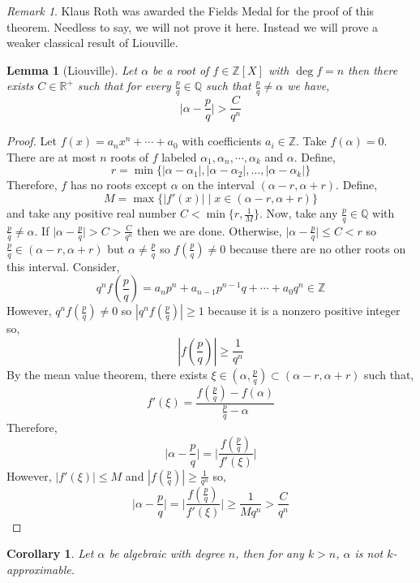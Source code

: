 \documentclass{article}
\newcommand{\Z}{\mathbb{Z}}
\newcommand{\Q}{\mathbb{Q}}
\newcommand{\Rplus}{\mathbb{R}^+}
\theoremstyle{theorem}
\newtheorem{lemma}[theorem]{Lemma}
\newtheorem{corollary}[theorem]{Corollary}
\theoremstyle{definition}
\theoremstyle{definition}
\theoremstyle{remark}
\theoremstyle{definition}
\theoremstyle{remark}
\newtheorem{remark}{Remark}[subsection]
\begin{document}
\begin{remark}
Klaus Roth was awarded the Fields Medal for the proof of this theorem. Needless to say, we will not prove it here. Instead we will prove a weaker classical result of Liouville.
\end{remark}

\begin{lemma}[Liouville]
Let $\alpha$ be a root of $f \in \Z[X]$ with $\deg{f} = n$ then there exists $C \in \Rplus$ such that for every $\frac{p}{q} \in \Q$ such that $\frac{p}{q} \neq \alpha$ we have,
\[ \Big| \alpha - \frac{p}{q} \Big| > \frac{C}{q^n}\]
\end{lemma}

\begin{proof}
Let $f(x) = a_n x^n + \cdots + a_0$ with coefficients $a_i \in \Z$. Take $f(\alpha) = 0$. There are at most $n$ roots of $f$ labeled $\alpha_1, \alpha_n, \cdots, \alpha_k$ and $\alpha$. Define, 
\[r = \min\{|\alpha - \alpha_1|, |\alpha - \alpha_2|, \dots, |\alpha - \alpha_k|\}\]
Therefore, $f$ has no roots except $\alpha$ on the interval $(\alpha - r, \alpha + r)$. Define, 
\[ M = \max \{ |f'(x)| \mid x \in (\alpha - r, \alpha + r) \}\]
and take any positive real number $C < \min\{r, \frac{1}{M}\}$. 
Now, take any $\frac{p}{q} \in \Q$ with $\frac{p}{q} \neq \alpha$. If $\Big| \alpha - \frac{p}{q} \Big| > C > \frac{C}{q^n}$ then we are done. Otherwise, $\Big| \alpha - \frac{p}{q} \Big| \le C < r$ so $\frac{p}{q} \in (\alpha - r, \alpha + r)$ but $\alpha \neq \frac{p}{q}$ so $f(\frac{p}{q}) \neq 0$ because there are no other roots on this interval. Consider,
\[q^n f\left(\frac{p}{q}\right) = a_n p^n + a_{n-1} p^{n-1}q + \cdots + a_0 q^n \in \Z\]
However, $q^n f(\frac{p}{q}) \neq 0$ so $|q^n f(\frac{p}{q})| \ge 1$ because it is a nonzero positive integer so,
\[ \left| f \left( \frac{p}{q} \right) \right| \ge \frac{1}{q^n} \]
By the mean value theorem, there exists $\xi \in (\alpha, \frac{p}{q}) \subset (\alpha - r, \alpha + r)$
such that, \[f'(\xi) = \frac{f(\frac{p}{q}) - f(\alpha)}{\frac{p}{q} - \alpha}\]
Therefore, 
\[\Big| \alpha - \frac{p}{q} \Big| = \Bigg| \frac{f(\frac{p}{q})}{f'(\xi)} \Bigg| \] 
However, $|f'(\xi)| \le M$ and $|f(\frac{p}{q})| \ge \frac{1}{q^n}$ so,
\[\Big| \alpha - \frac{p}{q} \Big| = \Bigg| \frac{f(\frac{p}{q})}{f'(\xi)} \Bigg| \ge \frac{1}{M q^n} > \frac{C}{q^n} \] 
\end{proof}

\begin{corollary}
Let $\alpha$ be algebraic with degree $n$, then for any $k > n$, $\alpha$ is not $k$-approximable. 
\end{corollary}
\end{document}
